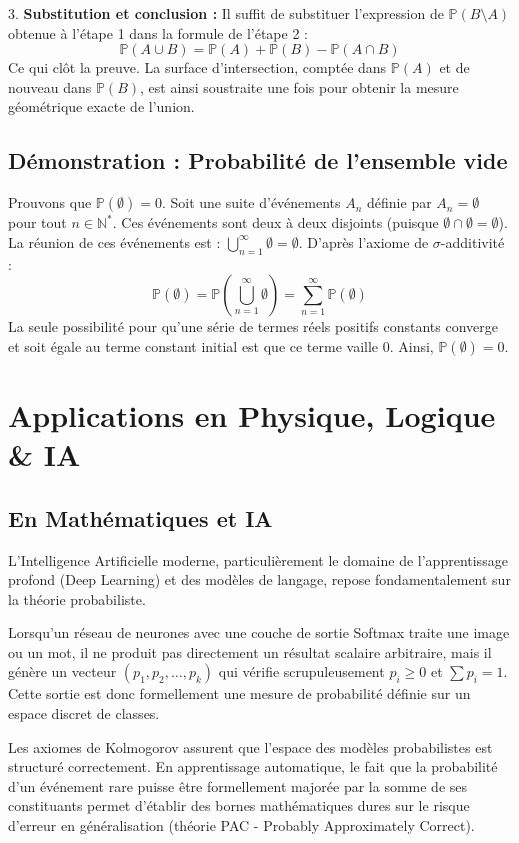 \documentclass[11pt,a4paper]{article}
\begin{document}
3. \textbf{Substitution et conclusion :}
   Il suffit de substituer l'expression de $\mathbb{P}(B \setminus A)$ obtenue à l'étape 1 dans la formule de l'étape 2 :
   $$\mathbb{P}(A \cup B) = \mathbb{P}(A) + \mathbb{P}(B) - \mathbb{P}(A \cap B)$$
   Ce qui clôt la preuve. La surface d'intersection, comptée dans $\mathbb{P}(A)$ et de nouveau dans $\mathbb{P}(B)$, est ainsi soustraite une fois pour obtenir la mesure géométrique exacte de l'union.

\subsection{Démonstration : Probabilité de l'ensemble vide}

Prouvons que $\mathbb{P}(\emptyset) = 0$.
Soit une suite d'événements $A_n$ définie par $A_n = \emptyset$ pour tout $n \in \mathbb{N}^*$.
Ces événements sont deux à deux disjoints (puisque $\emptyset \cap \emptyset = \emptyset$).
La réunion de ces événements est : $\bigcup_{n=1}^\infty \emptyset = \emptyset$.
D'après l'axiome de $\sigma$-additivité :
$$ \mathbb{P}(\emptyset) = \mathbb{P}\left(\bigcup_{n=1}^\infty \emptyset \right) = \sum_{n=1}^\infty \mathbb{P}(\emptyset) $$
La seule possibilité pour qu'une série de termes réels positifs constants converge et soit égale au terme constant initial est que ce terme vaille $0$.
Ainsi, $\mathbb{P}(\emptyset) = 0$.

\section{Applications en Physique, Logique \& IA}

\subsection{En Mathématiques et IA}

L'Intelligence Artificielle moderne, particulièrement le domaine de l'apprentissage profond (Deep Learning) et des modèles de langage, repose fondamentalement sur la théorie probabiliste.

Lorsqu'un réseau de neurones avec une couche de sortie Softmax traite une image ou un mot, il ne produit pas directement un résultat scalaire arbitraire, mais il génère un vecteur $(p_1, p_2, \dots, p_k)$ qui vérifie scrupuleusement $p_i \ge 0$ et $\sum p_i = 1$. Cette sortie est donc formellement une mesure de probabilité définie sur un espace discret de classes.

Les axiomes de Kolmogorov assurent que l'espace des modèles probabilistes est structuré correctement. En apprentissage automatique, le fait que la probabilité d'un événement rare puisse être formellement majorée par la somme de ses constituants permet d'établir des bornes mathématiques dures sur le risque d'erreur en généralisation (théorie PAC - Probably Approximately Correct).
\end{document}
